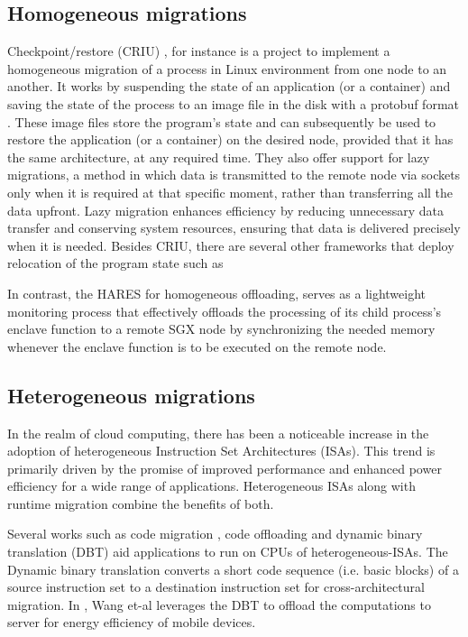 \documentclass[article, doublespace,nopageskip]{VTthesis} %
\newcommand{\monitor}{HARES }
\begin{document}
    \subsection{Homogeneous migrations}
    Checkpoint/restore (CRIU) \cite{CRIU}, for instance is a project to implement a homogeneous migration of a process in Linux environment from one node to an another. It works by suspending the state of an application (or a container) and saving the state of the process to an image file in the disk with a protobuf format \cite{Protobuf}. These image files store the program's state and can subsequently be used to restore the application (or a container) on the desired node, provided that it has the same architecture, at any required time. They also offer support for lazy migrations, a method in which data is transmitted to the remote node via sockets only when it is required at that specific moment, rather than transferring all the data upfront. Lazy migration enhances efficiency by reducing unnecessary data transfer and conserving system resources, ensuring that data is delivered precisely when it is needed. Besides CRIU, there are several other frameworks that deploy relocation of the program state such as \cite{migration:wiki} 

    In contrast, the \monitor for homogeneous offloading, serves as a lightweight monitoring process that effectively offloads the processing of its child process's enclave function to a remote SGX node by synchronizing the needed memory whenever the enclave function is to be executed on the remote node.

    \subsection{Heterogeneous migrations}
    In the realm of cloud computing, there has been a noticeable increase in the adoption of heterogeneous Instruction Set Architectures (ISAs). This trend is primarily driven by the promise of improved performance and enhanced power efficiency for a wide range of applications. Heterogeneous ISAs along with runtime migration combine the benefits of both. 
    
    Several works such as code migration \cite{hcontainer, het_isa_migrate:asplos12}, code offloading \cite{offload:mobisys17} and dynamic binary translation (DBT) \cite{dbt:tc01} aid applications to run on CPUs of heterogeneous-ISAs. The Dynamic binary translation converts a short code sequence (i.e. basic blocks) of a source instruction set to a destination instruction set for cross-architectural migration. In \cite{offload:mobisys17}, Wang et-al leverages the DBT to offload the computations to server for energy efficiency of mobile devices. 
\end{document}
